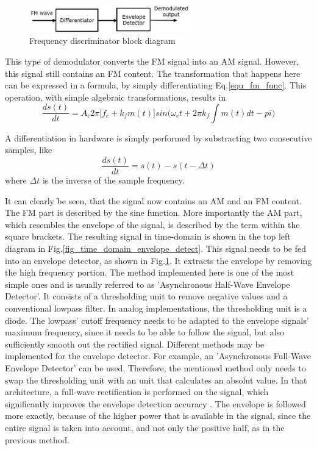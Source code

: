 \documentclass[conference]{IEEEtran}
\begin{document}
    \begin{figure}[!h]
      \centering
        \includegraphics[width=7cm]{img/discrimination_method_bd1.jpg}
      \caption{Frequency discriminator block diagram \cite{ref_fig_freq_discriminator}}
      \label{fig_bd_freq_discriminator}
    \end{figure}

    This type of demodulator converts the FM signal into an AM signal.
    However, this signal still contains an FM content.
    The transformation that happens here can be expressed in a formula, by simply differentiating Eq.\ref{equ_fm_func}.
    This operation, with simple algebraic transformations, results in
    \begin{equation}
      \frac{d s(t)}{dt} = A_c 2 \pi \Big[f_c + k_f m(t) \Big] sin \Big(\omega_c t + 2 \pi k_f \int m(t) dt -pi \Big)
    \end{equation}

    A differentiation in hardware is simply performed by substracting two consecutive samples, like
    \begin{equation}
      \frac{d s(t)}{dt} = s(t) - s(t-\Delta t)
      \label{equ_differentiator_two_samples}
    \end{equation}
    where $\Delta t$ is the inverse of the sample frequency.

    It can clearly be seen, that the signal now contains an AM and an FM content.
    The FM part is described by the sine function.
    More importantly the AM part, which resembles the envelope of the signal, is described by the term within the square brackets.
    The resulting signal in time-domain is shown in the top left diagram in Fig.\ref{fig_time_domain_envelope_detect}.
    This signal needs to be fed into an envelope detector, as shown in Fig.\ref{fig_bd_freq_discriminator}.
    It extracts the envelope by removing the high frequency portion.
    The method implemented here is one of the most simple ones and is usually referred to as 'Asynchronous Half-Wave Envelope Detector'\cite{ref_envelope_detector}.
    It consists of a thresholding unit to remove negative values and a conventional lowpass filter.
    In analog implementations, the thresholding unit is a diode.
    The lowpass' cutoff frequency needs to be adapted to the envelope signals' maximum frequency, since it needs to be able to follow the signal, but also sufficiently smooth out the rectified signal.
    Different methods may be implemented for the envelope detector.
    For example, an 'Asynchronous Full-Wave Envelope Detector' can be used.
    Therefore, the mentioned method only needs to swap the thresholding unit with an unit that calculates an absolut value.
    In that architecture, a full-wave rectification is performed on the signal, which significantly improves the envelope detection accuracy \cite{ref_envelope_detector}.
    The envelope is followed more exactly, because of the higher power that is available in the signal, since the entire signal is taken into account, and not only the positive half, as in the previous method.
\end{document}
